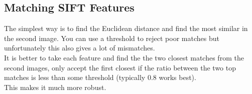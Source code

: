 \documentclass{article}
\begin{document}
	\subsection*{Matching SIFT Features}
	The simplest way is to find the Euclidean distance and find the most similar in the second image. You can use a threshold to reject poor matches but unfortunately this also gives a lot of mismatches.\\
	It is better to take each feature and find the the two closest matches from the second images, only accept the first closest if the ratio between the two top matches is less than some threshold (typically 0.8 works best).\\
	This makes it much more robust.
	
\end{document}
